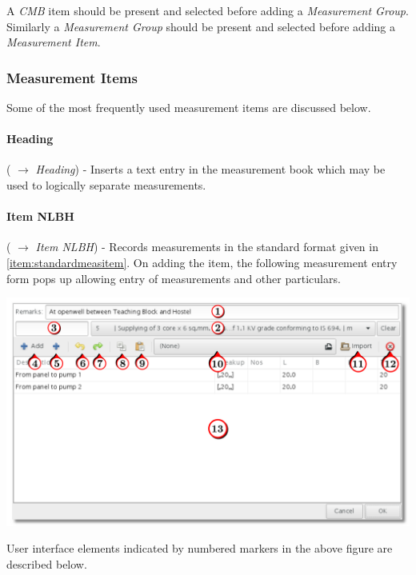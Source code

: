 \documentclass[twoside,a4paper]{refart}
\newenvironment{noteblock}[1]%
{\begin{mdframed}[topline=false,bottomline=false, rightline=false,
		linewidth=2pt, frametitle={#1}]}%
		{\end{mdframed}}
\begin{document}
	 \begin{noteblock}{Note:}
	 	A \emph{CMB} item should be present and selected before adding a \emph{Measurement Group}. Similarly a \emph{Measurement Group} should be present and selected before adding a \emph{Measurement Item}.
	 \end{noteblock}
	 
	 \subsubsection{Measurement Items}
	 
	 Some of the most frequently used measurement items are discussed below.
	 
	 \paragraph{Heading} (\fbox{\emph{$+$}} $\rightarrow$ \emph{Heading}) - Inserts a text entry in the measurement book which may be used to logically separate measurements.
	 
	 \paragraph{Item NLBH} \label{item:measitemnlbh} (\fbox{\emph{$+$}} $\rightarrow$ \emph{Item NLBH}) - Records measurements in the standard format given in \ref{item:standardmeasitem}. On adding the item, the following measurement entry form pops up allowing entry of measurements and other particulars.
	 
	 \begin{maxipage}
	 	\includegraphics[width=1\linewidth]{screenshots/window_nlbh.png}
	 \end{maxipage}
	 
	 User interface elements indicated by numbered markers in the above figure are described below.
	 
\end{document}
